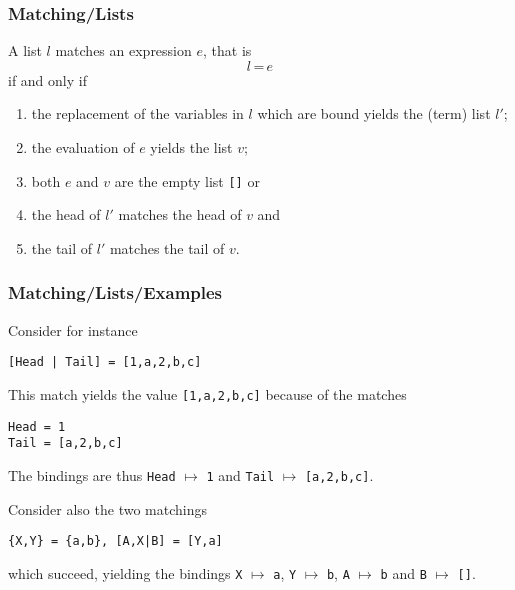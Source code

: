 %
\begin{frame}
\frametitle{Matching/Lists}

A list \(l\) matches an expression \(e\), that is
\[
l \, \texttt{=} \, e
\]
if and only if
\begin{enumerate}

  \item the replacement of the variables in \(l\) which are bound
    yields the (term) list \(l'\);

  \item the evaluation of \(e\) yields the list \(v\);

  \item both \(e\) and \(v\) are the empty list \texttt{[]} or

  \item the head of \(l'\) matches the head of \(v\) and

  \item the tail of \(l'\) matches the tail of \(v\).

\end{enumerate}

\end{frame}

%
\begin{frame}[containsverbatim]
\frametitle{Matching/Lists/Examples}

Consider for instance
\begin{verbatim}
[Head | Tail] = [1,a,2,b,c]
\end{verbatim}
This match yields the value \texttt{[1,a,2,b,c]} because of the matches
\begin{verbatim}
Head = 1
Tail = [a,2,b,c]
\end{verbatim}
The bindings are thus \texttt{Head} \(\mapsto\) \texttt{1} and
\texttt{Tail} \(\mapsto\) \texttt{[a,2,b,c]}.

Consider also the two matchings
\begin{verbatim}
{X,Y} = {a,b}, [A,X|B] = [Y,a]
\end{verbatim}
which succeed, yielding the bindings \texttt{X} \(\mapsto\)
\texttt{a}, \texttt{Y} \(\mapsto\) \texttt{b}, \texttt{A}
\(\mapsto\) \texttt{b} and \texttt{B} \(\mapsto\) \texttt{[]}.

\end{frame}

